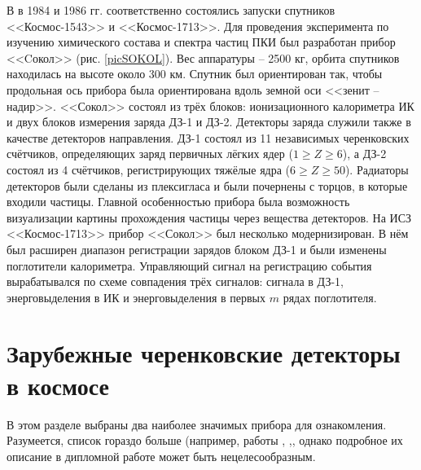 \documentclass[12pt,a4paper]{report} %
\begin{document}
В в 1984 и 1986 гг. соответственно состоялись запуски спутников <<Космос-1543>> и <<Космос-1713>>. Для проведения эксперимента по изучению химического состава и спектра частиц ПКИ был разработан прибор <<Cокол>> (рис. \ref{picSOKOL}). 
Вес аппаратуры – 2500 кг, орбита спутников находилась на высоте около 300 км. 
Спутник был ориентирован так, чтобы продольная ось прибора была ориентирована вдоль земной оси <<зенит – надир>>. <<Сокол>> состоял из трёх блоков: ионизационного калориметра ИК и двух блоков измерения заряда ДЗ-1 и ДЗ-2. Детекторы заряда служили также в качестве детекторов направления. ДЗ-1 состоял из 11 независимых черенковских счётчиков, определяющих заряд первичных лёгких ядер ($1\geq Z\geq 6$), а ДЗ-2 состоял из 4 счётчиков, регистрирующих тяжёлые ядра ($6\geq Z\geq 50$). Радиаторы детекторов были сделаны из плексигласа и были почернены с торцов, в которые входили частицы.
Главной особенностью прибора была возможность визуализации картины прохождения частицы через вещества детекторов.
На ИСЗ <<Космос-1713>> прибор <<Сокол>> был несколько модернизирован. В нём был расширен диапазон регистрации зарядов блоком ДЗ-1 и были изменены поглотители калориметра. Управляющий сигнал на регистрацию события вырабатывался по схеме совпадения трёх сигналов: сигнала в ДЗ-1, энерговыделения в ИК и энерговыделения в первых $m$ рядах поглотителя.
\section{Зарубежные черенковские детекторы в космосе}
В этом разделе выбраны два наиболее значимых прибора для ознакомления. Разумеется, список гораздо больше (например, работы \cite{Shuttle}, \cite{ESRO2},\cite{ISEE3}, однако подробное их описание в дипломной работе может быть нецелесообразным.
\end{document}
